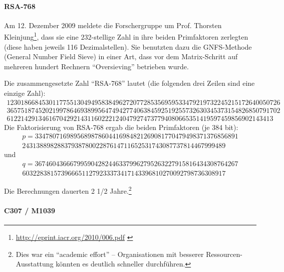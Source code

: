 \begin{refsegment}
\hypertarget{RSA-768-chap3}{}
\paragraph*{RSA-768} \label{RSA-768} \mbox{}
\nopagebreak

Am 12. Dezember 2009 meldete die Forschergruppe um Prof. Thorsten
Kleinjung\footnote{%
   \url{http://eprint.iacr.org/2010/006.pdf} \cite{Kleinjung2010}
          }, dass sie
eine $232$-stellige Zahl in ihre beiden Primfaktoren zerlegten
(diese haben jeweils 116 Dezimalstellen).
Sie benutzten dazu die GNFS-Methode (General Number Field Sieve)
 in einer Art, dass vor dem
Matrix-Schritt auf mehreren hundert Rechnern "`Oversieving"' betrieben wurde.

Die zusammengesetzte Zahl "`RSA-768"' lautet (die folgenden drei Zeilen
sind eine einzige Zahl):
$$
\begin{array}{c}
123018668453011775513049495838496272077285356959533479219732245215172640050726\\
365751874520219978646938995647494277406384592519255732630345373154826850791702\\
6122142913461670429214311602221240479274737794080665351419597459856902143413
\end{array}
$$
Die Faktorisierung von RSA-768 ergab die beiden Primfaktoren (je 384 bit):
$$
\begin{array}{c}
p = 3347807169895689878604416984821269081770479498371376856891\\
    2431388982883793878002287614711652531743087737814467999489
\end{array}
$$
und
$$
\begin{array}{c}
q = 3674604366679959042824463379962795263227915816434308764267\\
    6032283815739666511279233373417143396810270092798736308917
\end{array}
$$

Die Berechnungen dauerten 2 1/2 Jahre.\footnote{%
Dies war ein "`academic effort"' -- Organisationen mit besserer Ressourcen-Ausstattung
könnten es deutlich schneller durchführen.}





\paragraph*{C307 / M1039} \label{C307}  
\mbox{} %
\hypertarget{C307-chap3}{}


\end{refsegment}
